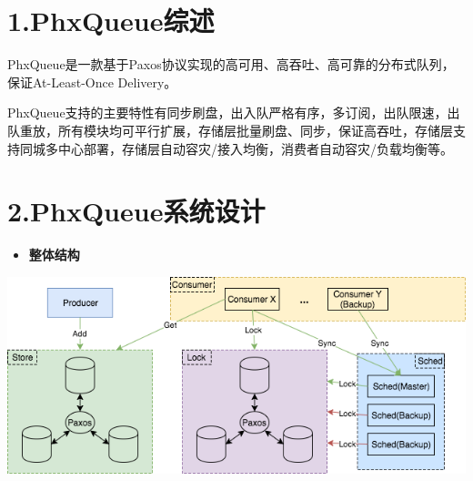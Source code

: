 \documentclass{article}
\begin{document}
\mdxtitleblockstart{}
\mdxauthorstart{}
\mdxauthorend\mdtitleauthorrunning{}{}\mdxtitleblockend%

\section{1.\hspace*{0.5em}PhxQueue综述}\label{sec-phxqueue}%

\noindent{}\hspace*{1em}\hspace*{1em}PhxQueue是一款基于Paxos协议实现的高可用、高吞吐、高可靠的分布式队列，保证At-Least-Once Delivery。%

\hspace*{1em}\hspace*{1em}PhxQueue支持的主要特性有同步刷盘，出入队严格有序，多订阅，出队限速，出队重放，所有模块均可平行扩展，存储层批量刷盘、同步，保证高吞吐，存储层支持同城多中心部署，存储层自动容灾/接入均衡，消费者自动容灾/负载均衡等。%

\section{2.\hspace*{0.5em}PhxQueue系统设计}\label{sec-phxqueue}%

\begin{itemize}[noitemsep,topsep=\mdcompacttopsep]%

\item{}\textbf{整体结构}%
\end{itemize}%

\noindent{}\includegraphics[keepaspectratio=true,width=\dimmin{}{\dimwidth{0.90}}]{images/1505466623_80_w633_h271}{}%
\end{document}
